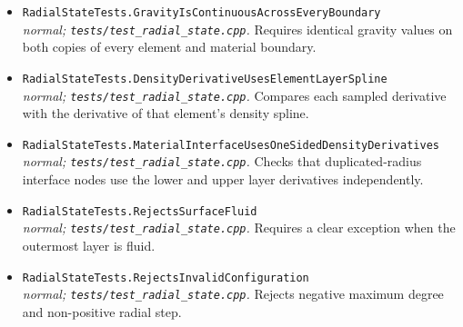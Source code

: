 \begin{itemize}[leftmargin=1.4em,itemsep=0.35em]
\item {\footnotesize\texttt{RadialStateTests.GravityIsContinuousAcrossEveryBoundary}}\\
\emph{normal; \texttt{tests/test\_radial\_state.cpp}.} Requires identical gravity values on both copies of every element and material boundary.
\item {\footnotesize\texttt{RadialStateTests.DensityDerivativeUsesElementLayerSpline}}\\
\emph{normal; \texttt{tests/test\_radial\_state.cpp}.} Compares each sampled derivative with the derivative of that element's density spline.
\item {\footnotesize\texttt{RadialStateTests.MaterialInterfaceUsesOneSidedDensityDerivatives}}\\
\emph{normal; \texttt{tests/test\_radial\_state.cpp}.} Checks that duplicated-radius interface nodes use the lower and upper layer derivatives independently.
\item {\footnotesize\texttt{RadialStateTests.RejectsSurfaceFluid}}\\
\emph{normal; \texttt{tests/test\_radial\_state.cpp}.} Requires a clear exception when the outermost layer is fluid.
\item {\footnotesize\texttt{RadialStateTests.RejectsInvalidConfiguration}}\\
\emph{normal; \texttt{tests/test\_radial\_state.cpp}.} Rejects negative maximum degree and non-positive radial step.
\end{itemize}
